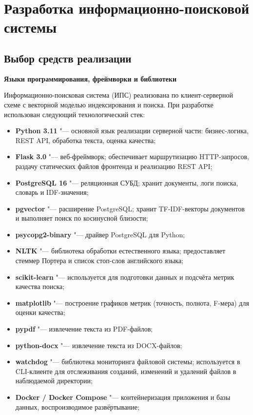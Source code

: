 \section{Разработка информационно-поисковой системы}
\label{sec:development}

\subsection{Выбор средств реализации}

\textbf{Языки программирования, фреймворки и библиотеки}

Информационно-поисковая система (ИПС) реализована по клиент-серверной схеме с
векторной моделью индексирования и поиска. При разработке использован следующий
технологический стек:

\begin{itemize}
	\item \textbf{Python 3.11} "--- основной язык реализации серверной части: бизнес-логика, REST API, обработка текста, оценка качества;
	\item \textbf{Flask 3.0} "--- веб-фреймворк; обеспечивает маршрутизацию HTTP-запросов, раздачу статических файлов фронтенда и реализацию REST API;
	\item \textbf{PostgreSQL 16} "--- реляционная СУБД; хранит документы, логи поиска, словарь и IDF-значения;
	\item \textbf{pgvector} "--- расширение PostgreSQL; хранит TF-IDF-векторы документов и выполняет поиск по косинусной близости;
	\item \textbf{psycopg2-binary} "--- драйвер PostgreSQL для Python;
	\item \textbf{NLTK} "--- библиотека обработки естественного языка; предоставляет стеммер Портера и список стоп-слов английского языка;
	\item \textbf{scikit-learn} "--- используется для подготовки данных и подсчёта метрик качества поиска;
	\item \textbf{matplotlib} "--- построение графиков метрик (точность, полнота, F-мера) для оценки качества;
	\item \textbf{pypdf} "--- извлечение текста из PDF-файлов;
	\item \textbf{python-docx} "--- извлечение текста из DOCX-файлов;
	\item \textbf{watchdog} "--- библиотека мониторинга файловой системы; используется в CLI-клиенте для отслеживания созданий, изменений и удалений файлов в наблюдаемой директории;
	\item \textbf{Docker / Docker Compose} "--- контейнеризация приложения и базы данных, воспроизводимое развёртывание;

\end{itemize}
